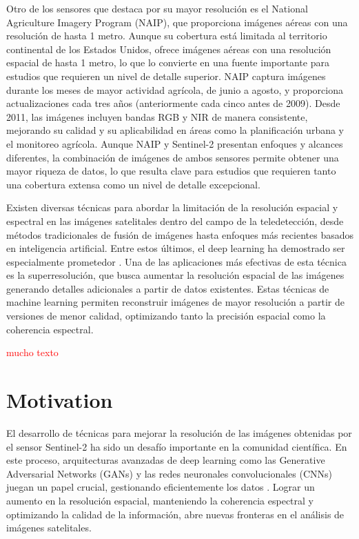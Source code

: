 Otro de los sensores que destaca por su mayor resolución es el National Agriculture Imagery Program (NAIP), que proporciona imágenes aéreas con una resolución de hasta 1 metro. Aunque su cobertura está limitada al territorio continental de los Estados Unidos, ofrece imágenes aéreas con una resolución espacial de hasta 1 metro, lo que lo convierte en una fuente importante para estudios que requieren un nivel de detalle superior. NAIP captura imágenes durante los meses de mayor actividad agrícola, de junio a agosto, y proporciona actualizaciones cada tres años (anteriormente cada cinco antes de 2009). Desde 2011, las imágenes incluyen bandas RGB y NIR de manera consistente, mejorando su calidad y su aplicabilidad en áreas como la planificación urbana y el monitoreo agrícola. Aunque NAIP y Sentinel-2 presentan enfoques y alcances diferentes, la combinación de imágenes de ambos sensores permite obtener una mayor riqueza de datos, lo que resulta clave para estudios que requieren tanto una cobertura extensa como un nivel de detalle excepcional.

Existen diversas técnicas para abordar la limitación de la resolución espacial y espectral en las imágenes satelitales dentro del campo de la teledetección, desde métodos tradicionales de fusión de imágenes hasta enfoques más recientes basados en inteligencia artificial. Entre estos últimos, el deep learning ha demostrado ser especialmente prometedor \autocite{gargiulo2019fast}. Una de las aplicaciones más efectivas de esta técnica es la superresolución, que busca aumentar la resolución espacial de las imágenes generando detalles adicionales a partir de datos existentes. Estas técnicas de machine learning permiten reconstruir imágenes de mayor resolución a partir de versiones de menor calidad, optimizando tanto la precisión espacial como la coherencia espectral.


\textcolor{red}{mucho texto}

\section{Motivation}

El desarrollo de técnicas para mejorar la resolución de las imágenes obtenidas por el sensor Sentinel-2 ha sido un desafío importante en la comunidad científica. En este proceso, arquitecturas avanzadas de deep learning como las Generative Adversarial Networks (GANs) y las redes neuronales convolucionales (CNNs) juegan un papel crucial, gestionando eficientemente los datos \autocite{salgueiro2020super}. Lograr un aumento en la resolución espacial, manteniendo la coherencia espectral y optimizando la calidad de la información, abre nuevas fronteras en el análisis de imágenes satelitales.

